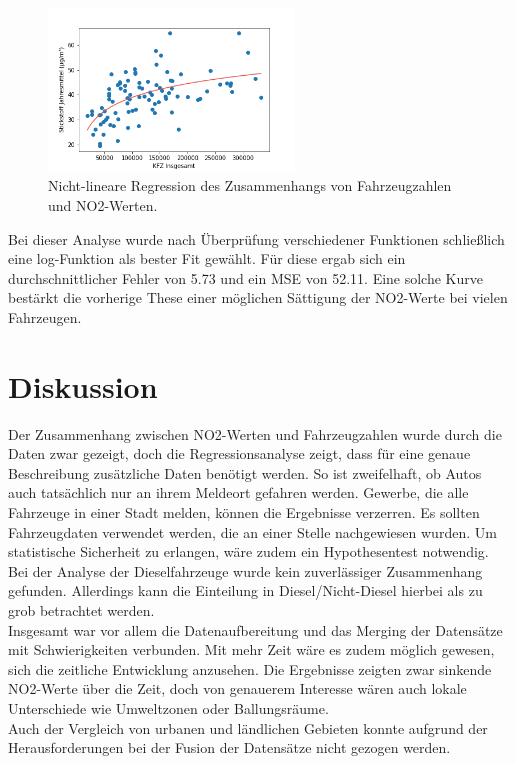 \documentclass[11pt,a4paper,oneside,german]{article}
\begin{document}
	\begin{figure}[H]
	\centering
	\includegraphics[width=6.5cm]{log_curve_fit.png}
	\caption{Nicht-lineare Regression des Zusammenhangs von Fahrzeugzahlen und NO2-Werten.}
	\label{fig:nonlinreg}
	\end{figure}
	
	Bei dieser Analyse wurde nach Überprüfung verschiedener Funktionen schließlich eine log-Funktion als bester Fit gewählt. Für diese ergab sich ein durchschnittlicher Fehler von 5.73 und ein MSE von 52.11. Eine solche Kurve bestärkt die vorherige These einer möglichen Sättigung der NO2-Werte bei vielen Fahrzeugen.

	
	\section{Diskussion}
	
	Der Zusammenhang zwischen NO2-Werten und Fahrzeugzahlen wurde durch die Daten zwar gezeigt, doch die Regressionsanalyse zeigt, dass für eine genaue Beschreibung zusätzliche Daten benötigt werden. So ist zweifelhaft, ob Autos auch tatsächlich nur an ihrem Meldeort gefahren werden. Gewerbe, die alle Fahrzeuge in einer Stadt melden, können die Ergebnisse verzerren. Es sollten Fahrzeugdaten verwendet werden, die an einer Stelle nachgewiesen wurden. Um statistische Sicherheit zu erlangen, wäre zudem ein Hypothesentest notwendig. \\
	Bei der Analyse der Dieselfahrzeuge wurde kein zuverlässiger Zusammenhang gefunden. Allerdings kann die Einteilung in Diesel/Nicht-Diesel hierbei als zu grob betrachtet werden. \\
	Insgesamt war vor allem die Datenaufbereitung und das Merging der Datensätze mit Schwierigkeiten verbunden. Mit mehr Zeit wäre es zudem möglich gewesen, sich die zeitliche Entwicklung anzusehen. Die Ergebnisse zeigten zwar sinkende NO2-Werte über die Zeit, doch von genauerem Interesse wären auch lokale Unterschiede wie Umweltzonen oder Ballungsräume. \\
	Auch der Vergleich von urbanen und ländlichen Gebieten konnte aufgrund der Herausforderungen bei der Fusion der Datensätze nicht gezogen werden. \\
	
\end{document}
